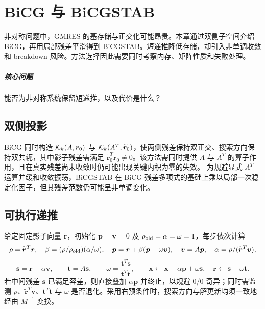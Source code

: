 \chapter{BiCG 与 BiCGSTAB}\label{v0ch:14}
\begin{chaptersummary}
非对称问题中，GMRES 的基存储与正交化可能昂贵。本章通过双侧子空间介绍 BiCG，再用局部残差平滑得到 BiCGSTAB。短递推降低存储，却引入非单调收敛和 breakdown 风险。方法选择因此需要同时考察内存、矩阵性质和失败处理。
\end{chaptersummary}
\paragraph{核心问题}能否为非对称系统保留短递推，以及代价是什么？

\section{双侧投影}
BiCG 同时构造 $\mathcal K_k(A,\bm r_0)$ 与 $\mathcal K_k(A^T,\widetilde{\bm r}_0)$，使两侧残差保持双正交、搜索方向保持双共轭，其中影子残差需满足 $\widetilde{\bm r}_0^T\bm r_0\ne0$。该方法需同时提供 $A$ 与 $A^T$ 的算子作用，且在真实残差尚未收敛时仍可能出现关键内积为零的失效。
为规避显式 $A^T$ 运算并缓和收敛振荡，BiCGSTAB 在 BiCG 残差多项式的基础上乘以局部一次稳定化因子，但其残差范数仍可能呈非单调变化。
\section{可执行递推}
给定固定影子向量 $\widetilde{\bm r}$，初始化 $\bm p=\bm v=0$ 及 $\rho_{\rm old}=\alpha=\omega=1$，每步依次计算
\[
 \rho=\widetilde{\bm r}^T\bm r,\quad
 \beta=(\rho/\rho_{\rm old})(\alpha/\omega),\quad
 \bm p=\bm r+\beta(\bm p-\omega\bm v),\quad
 \bm v=A\bm p,\quad \alpha=\rho/(\widetilde{\bm r}^T\bm v),
\]
\[
 \bm s=\bm r-\alpha\bm v,\qquad
 \bm t=A\bm s,\qquad
 \omega=\frac{\bm t^T\bm s}{\bm t^T\bm t},\qquad
 \bm x\leftarrow\bm x+\alpha\bm p+\omega\bm s,\quad
 \bm r\leftarrow\bm s-\omega\bm t.
\]
若中间残差 $\bm s$ 已满足容差，则直接叠加 $\alpha\bm p$ 并终止，以规避 $0/0$ 奇异；同时需监测 $\rho$、$\widetilde{\bm r}^T\bm v$、$\bm t^T\bm t$ 与 $\omega$ 是否退化。采用右预条件时，搜索方向与解更新均须一致地经由 $M^{-1}$ 变换。
